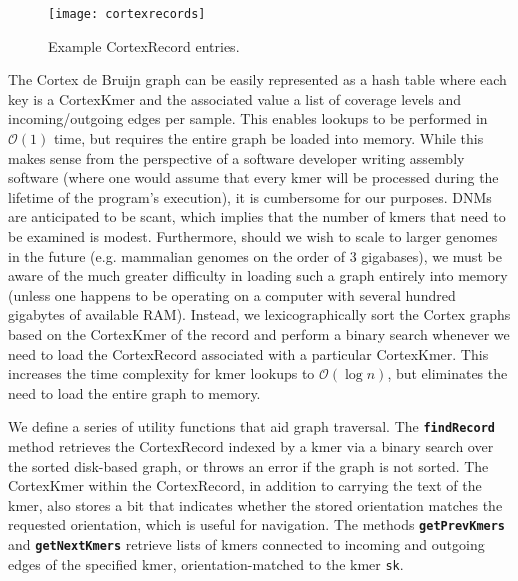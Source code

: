 \begin{figure}[h!]
  \centering
    \texttt{[image: cortexrecords]}
  \caption{Example CortexRecord entries.}
  \label{fig:cortexrecords}
\end{figure}

The Cortex de Bruijn graph can be easily represented as a hash table where each key is a CortexKmer and the associated value a list of coverage levels and incoming/outgoing edges per sample.  This enables lookups to be performed in $\mathcal{O}(1)$ time, but requires the entire graph be loaded into memory.  While this makes sense from the perspective of a software developer writing assembly software (where one would assume that every kmer will be processed during the lifetime of the program's execution), it is cumbersome for our purposes.  DNMs are anticipated to be scant, which implies that the number of kmers that need to be examined is modest.  Furthermore, should we wish to scale to larger genomes in the future (e.g. mammalian genomes on the order of $3$ gigabases), we must be aware of the much greater difficulty in loading such a graph entirely into memory (unless one happens to be operating on a computer with several hundred gigabytes of available RAM).  Instead, we lexicographically sort the Cortex graphs based on the CortexKmer of the record and perform a binary search whenever we need to load the CortexRecord associated with a particular CortexKmer.  This increases the time complexity for kmer lookups to $\mathcal{O}(\log{}n)$, but eliminates the need to load the entire graph to memory.

We define a series of utility functions that aid graph traversal.  The \textbf{\texttt{findRecord}} method retrieves the CortexRecord indexed by a kmer via a binary search over the sorted disk-based graph, or throws an error if the graph is not sorted.  The CortexKmer within the CortexRecord, in addition to carrying the text of the kmer, also stores a bit that indicates whether the stored orientation matches the requested orientation, which is useful for navigation.  The methods \textbf{\texttt{getPrevKmers}} and \textbf{\texttt{getNextKmers}} retrieve lists of kmers connected to incoming and outgoing edges of the specified kmer, orientation-matched to the kmer \texttt{sk}.

